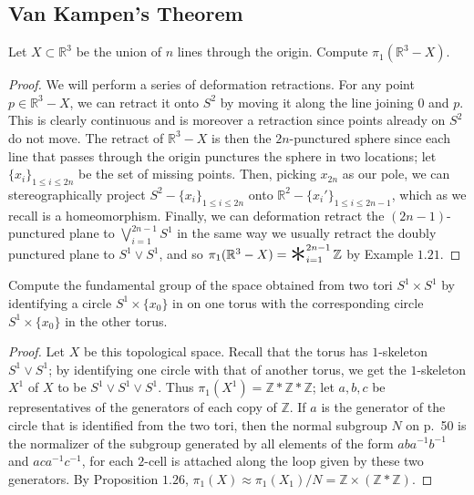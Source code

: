 \documentclass[12pt]{article}
\theoremstyle{remark}
\DeclareMathOperator*{\bigast}{\raisebox{-0.6ex}{\scalebox{2.5}{$\ast$}}}
\begin{document}
\subsection{Van Kampen's Theorem}
\setcounter{subsubsection}{3}
\begin{problem}
  Let $X \subset \mathbb{R}^3$ be the union of $n$ lines through the origin. Compute $\pi_1(\mathbb{R}^3 - X)$.
\end{problem}
\begin{proof}
  We will perform a series of deformation retractions. For any point $p \in \mathbb{R}^3 - X$, we can retract it onto $S^2$ by moving it along the line joining $0$ and $p$. This is clearly continuous and is moreover a retraction since points already on $S^2$ do not move. The retract of $\mathbb{R}^3 - X$ is then the $2n$-punctured sphere since each line that passes through the origin punctures the sphere in two locations; let $\{x_i\}_{1 \le i \le 2n}$ be the set of missing points. Then, picking $x_{2n}$ as our pole, we can stereographically project $S^2 - \{x_i\}_{1 \le i \le 2n}$ onto $\mathbb{R}^2 - \{x_i'\}_{1 \le i \le 2n-1}$, which as we recall is a homeomorphism. Finally, we can deformation retract the $(2n-1)$-punctured plane to $\bigvee_{i=1}^{2n-1} S^1$ in the same way we usually retract the doubly punctured plane to $S^1 \vee S^1$, and so $\pi_1(\mathbb{R}^3 - X) = \bigast_{i=1}^{2n-1} \mathbb{Z}$ by Example $1.21$.
\end{proof}

\setcounter{subsubsection}{7}
\begin{problem}
  Compute the fundamental group of the space obtained from two tori $S^1 \times S^1$ by identifying a circle $S^1 \times \{x_0\}$ in on one torus with the corresponding circle $S^1 \times \{x_0\}$ in the other torus.
\end{problem}
\begin{proof}
  Let $X$ be this topological space. Recall that the torus has $1$-skeleton $S^1
  \vee S^1$; by identifying one circle with that of another torus, we get the
  $1$-skeleton $X^1$ of $X$ to be $S^1 \vee S^1 \vee S^1$. Thus $\pi_1(X^1) =
  \mathbb{Z} \ast \mathbb{Z} \ast \mathbb{Z}$; let $a,b,c$ be representatives of
  the generators of each copy of $\mathbb{Z}$. If $a$ is the generator of the
  circle that is identified from the two tori, then the normal subgroup $N$ on
  p.~50 is the normalizer of the subgroup generated by all elements of the form
  $aba^{-1}b^{-1}$ and $aca^{-1}c^{-1}$, for each $2$-cell is attached along the
  loop given by these two generators. By Proposition $1.26$, $\pi_1(X) \approx
  \pi_1(X_1)/N = \mathbb{Z} \times (\mathbb{Z} \ast \mathbb{Z})$.
\end{proof}
\end{document}
